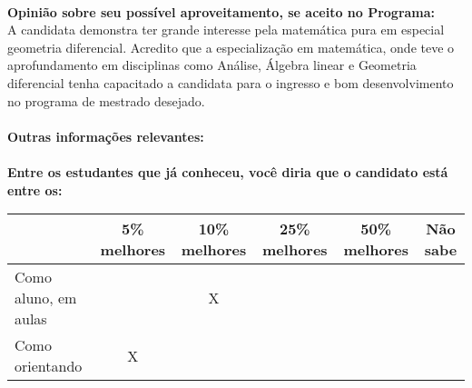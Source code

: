 \documentclass[11pt]{article}
\begin{document}
\\
\textbf{Opinião sobre seu possível aproveitamento, se aceito no Programa:}
\\A candidata demonstra ter grande interesse pela matemática pura em especial  geometria diferencial. Acredito que a especialização em matemática, onde teve o aprofundamento em disciplinas como Análise, Álgebra linear e Geometria diferencial tenha capacitado a candidata para o ingresso e bom desenvolvimento no programa de mestrado desejado.\\ 
\\
\textbf{Outras informações relevantes:} \\
\\[0.3cm]
\textbf{Entre os estudantes que já conheceu, você diria que o candidato está entre os:}
\\
\begin{tabular}{|l|c|c|c|c|c|}
\hline
 & 5\% melhores & 10\% melhores & 25\% melhores & 50\% melhores & Não sabe \\
\hline
Como aluno, em aulas &  & X &  &  & \\
\hline
Como orientando & X &  &  &  & \\
\hline
\end{tabular}
\end{document}
